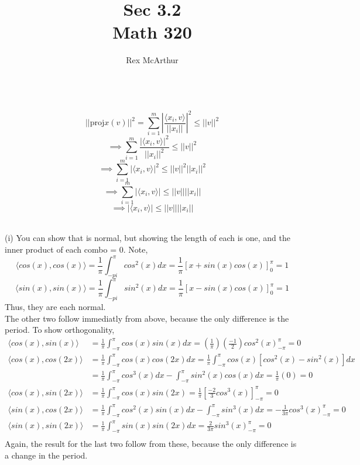 \documentclass[letterpaper,12pt]{article}
\title{Sec 3.2 \\Math 320}
\author{Rex McArthur}
\theoremstyle{definition}
\begin{document}
\maketitle
{}\\

\[ ||\text{proj}x(v) ||^2 = \sum^{m}_{i=1} \left| \frac{\langle x_i,v \rangle}{||x_i||}\right|^2 \leq ||v||^2\]
\[\implies \sum^{m}_{i=1}  \frac{|\langle x_i,v \rangle|^2}{||x_i||^2} \leq ||v||^2\]
\[\implies \sum^{m}_{i=1}  |\langle x_i,v \rangle|^2 \leq ||v||^2||x_i||^2\]
\[\implies \sum^{m}_{i=1}  |\langle x_i,v \rangle| \leq ||v||||x_i||\]
\[\implies   |\langle x_i,v \rangle| \leq ||v||||x_i||\]

\\
(i)
You can show that is normal, but showing the length of each is one, and the inner product of each combo = 0. Note,
\[\langle  cos(x), cos(x)\rangle   = \frac{1}{\pi}\int ^{\pi}_{-pi} cos^2(x)dx = \frac{1}{\pi}[x+sin(x)cos(x)]^\pi_0 = 1\]
\[\langle  sin(x), sin(x)\rangle   = \frac{1}{\pi}\int ^{\pi}_{-pi} sin^2(x)dx = \frac{1}{\pi}[x-sin(x)cos(x)]^\pi_0 = 1\]
Thus, they are each normal. \\
The other two follow immediatly from above, because the only difference is the period. To show orthogonality, 
\begin{align*}
\langle  cos(x), sin(x)\rangle   &= \frac{1}{\pi}\int ^\pi_{-\pi} cos(x)sin(x)dx = (\frac{1}{\pi})(\frac{-1}{2}) cos^2(x)_{-\pi}^\pi = 0 \\
\langle  cos(x), cos(2x)\rangle   &= \frac{1}{\pi}\int_{-\pi}^{\pi}cos(x)cos(2x)dx=\frac{1}{\pi}\int_{-\pi}^{\pi}cos(x)[cos^2(x)-sin^2(x)]dx \\
&=\frac{1}{\pi}\int_{-\pi}^{\pi}cos^3(x)dx-\int_{-\pi}^{\pi}sin^2(x)cos(x)dx = \frac{1}{\pi}(0)=0 \\
\langle  cos(x), sin(2x) \rangle   &= \frac{1}{\pi}\int_{-\pi}^{\pi}cos(x)sin(2x)=\frac{1}{\pi}[\frac{-2}{3}cos^3(x)]_{-\pi}^\pi=0 \\
\langle  sin(x), cos(2x) \rangle   &= \frac{1}{\pi}\int_{-\pi}^{\pi}cos^2(x)sin(x)dx-\int_{-\pi}^{\pi}sin^3(x)dx= -\frac{1}{3\pi}cos^3(x)_{-\pi}^\pi = 0 \\
\langle  sin(x),sin(2x)\rangle  &= \frac{1}{\pi}\int_{-\pi}^{\pi}sin(x)sin(2x)dx=\frac{2}{3\pi}sin^3(x)_{-\pi}^\pi = 0 \\
\end{align*}
Again, the result for the last two follow from these, because the only difference is a change in the period.\\
\end{document}
